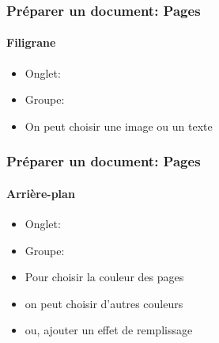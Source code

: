 \documentclass[xcolor=table]{beamer}
\begin{document}
\begin{frame}[t]
\frametitle{Préparer un document: Pages}
\framesubtitle{Filigrane}

\begin{minipage}{0.49\textwidth}
	\begin{itemize}
		\item Onglet: 
		\item Groupe: 
		\item On peut choisir une image ou un texte 
	\end{itemize}
\end{minipage}
\begin{minipage}{0.50\textwidth}
\end{minipage}

\end{frame}

\begin{frame}[t]
\frametitle{Préparer un document: Pages}
\framesubtitle{Arrière-plan}

\begin{minipage}{0.49\textwidth}
	\begin{itemize}
		\item Onglet: 
		\item Groupe: 
		\item Pour choisir la couleur des pages
		\item on peut choisir d'autres couleurs 
		\item ou, ajouter un effet de remplissage
	\end{itemize}
\end{minipage}
\begin{minipage}{0.50\textwidth}
	\vspace{1cm}
\end{minipage}

\end{frame}
\end{document}
